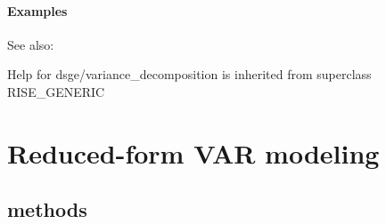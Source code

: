 \documentclass[letterpaper,10pt,english]{sphinxmanual}
\begin{document}
\subsubsection{Examples}
\label{classes/models/@dsge/dsge:id216}
See also:

Help for dsge/variance\_decomposition is inherited from superclass RISE\_GENERIC


\chapter{Reduced-form VAR modeling}
\label{classes/models/@rfvar/rfvar::doc}\label{classes/models/@rfvar/rfvar:reduced-form-var-modeling}

\section{methods}
\end{document}
